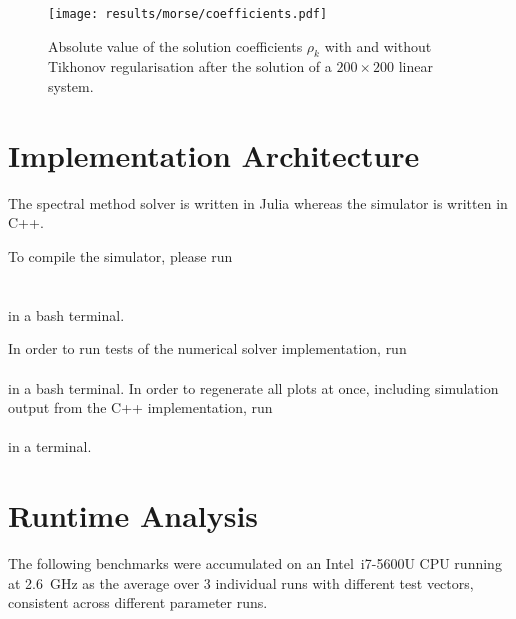 \begin{figure}[H]
  \centering
  \texttt{[image: results/morse/coefficients.pdf]}
  \caption[Absolute value of the coefficients with and without regularisation]{Absolute value of the solution coefficients $\rho_k$ with and without Tikhonov regularisation after the solution of a $200 \times 200$ linear system.}
  \label{fig:coefficients}
\end{figure}

\section{Implementation Architecture}
The spectral method solver is written in Julia \parencite{2017-julia} whereas the simulator is written in C++.

To compile the simulator, please run \\
 \\
 \\
in a bash terminal.

In order to run tests of the numerical solver implementation, run \\
 \\
in a bash terminal. In order to regenerate all plots at once, including simulation output from the C++ implementation, run \\
 \\
in a terminal.

\section{Runtime Analysis}
\label{sec:runtime-analysis}
The following benchmarks were accumulated on an Intel\textregistered \, i7-5600U CPU running at \SI{2.6}{\giga\hertz} as the average over 3 individual runs with different test vectors, consistent across different parameter runs.
